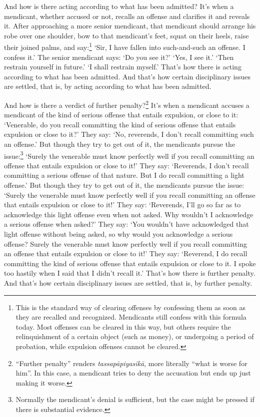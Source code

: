 \documentclass[12pt,openany]{book}%
\begin{document}
And how is there acting according to what has been admitted? It’s when a mendicant, whether accused or not, recalls an offense and clarifies it and reveals it. After approaching a more senior mendicant, that mendicant should arrange his robe over one shoulder, bow to that mendicant’s feet, squat on their heels, raise their joined palms, and say:\footnote{This is the standard way of clearing offenses by confessing them as soon as they are recalled and recognized. Mendicants still confess with this formula today. Most offenses can be cleared in this way, but others require the relinquishment of a certain object (such as money), or undergoing a period of probation, while expulsion offenses cannot be cleared. } ‘Sir, I have fallen into such-and-such an offense. I confess it.’ The senior mendicant says: ‘Do you see it?’ ‘Yes, I see it.’ ‘Then restrain yourself in future.’ ‘I shall restrain myself.’ That’s how there is acting according to what has been admitted. And that’s how certain disciplinary issues are settled, that is, by acting according to what has been admitted. 

And how is there a verdict of further penalty?\footnote{“Further penalty” renders \textit{\textsanskrit{tassapāpiyasikā}}, more literally “what is worse for him”. In this case, a mendicant tries to deny the accusation but ends up just making it worse. } It’s when a mendicant accuses a mendicant of the kind of serious offense that entails expulsion, or close to it: ‘Venerable, do you recall committing the kind of serious offense that entails expulsion or close to it?’ They say: ‘No, reverends, I don’t recall committing such an offense.’ But though they try to get out of it, the mendicants pursue the issue:\footnote{Normally the mendicant’s denial is sufficient, but the case might be pressed if there is substantial evidence. } ‘Surely the venerable must know perfectly well if you recall committing an offense that entails expulsion or close to it!’ They say: ‘Reverends, I don’t recall committing a serious offense of that nature. But I do recall committing a light offense.’ But though they try to get out of it, the mendicants pursue the issue: ‘Surely the venerable must know perfectly well if you recall committing an offense that entails expulsion or close to it!’ They say: ‘Reverends, I’ll go so far as to acknowledge this light offense even when not asked. Why wouldn’t I acknowledge a serious offense when asked?’ They say: ‘You wouldn’t have acknowledged that light offense without being asked, so why would you acknowledge a serious offense? Surely the venerable must know perfectly well if you recall committing an offense that entails expulsion or close to it!’ They say: ‘Reverend, I do recall committing the kind of serious offense that entails expulsion or close to it. I spoke too hastily when I said that I didn’t recall it.’ That’s how there is further penalty. And that’s how certain disciplinary issues are settled, that is, by further penalty. 
\end{document}
